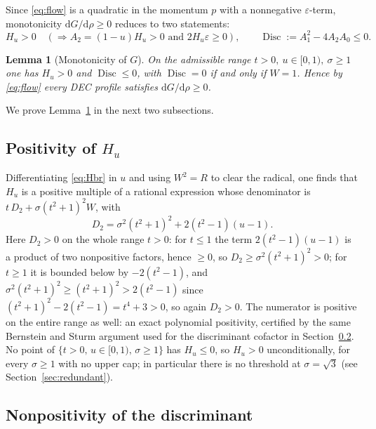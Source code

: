 \documentclass[11pt]{article}
\theoremstyle{plain}
\newtheorem{lemma}[theorem]{Lemma}
\theoremstyle{definition}
\newcommand{\dd}{\mathrm{d}}
\newcommand{\Disc}{\operatorname{Disc}}
\newcommand{\eps}{\varepsilon}
\begin{document}
Since \eqref{eq:flow} is a quadratic in the momentum $p$ with a nonnegative $\eps$-term, monotonicity
$\dd G/\dd\rho\ge0$ reduces to two statements:
\begin{equation*}
  H_u>0\quad(\Rightarrow A_2=(1-u)H_u>0\text{ and }2H_u\eps\ge0),\qquad \Disc:=A_1^2-4A_2A_0\le0 .
\end{equation*}

\begin{lemma}[Monotonicity of $G$]\label{lem:psd}
On the admissible range $t>0,\ u\in[0,1),\ \sigma\ge1$ one has $H_u>0$ and $\Disc\le0$, with $\Disc=0$
if and only if $W=1$. Hence by \eqref{eq:flow} every DEC profile satisfies $\dd G/\dd\rho\ge0$.
\end{lemma}

\noindent We prove Lemma~\ref{lem:psd} in the next two subsections.

\subsection{Positivity of \texorpdfstring{$H_u$}{Hu}}\label{sec:Hu}

Differentiating \eqref{eq:Hbr} in $u$ and using $W^2=R$ to clear the radical, one finds that $H_u$ is a
positive multiple of a rational expression whose denominator is $t\,D_2+\sigma(t^2+1)^2W$, with
\[
  D_2=\sigma^2(t^2+1)^2+2(t^2-1)(u-1).
\]
Here $D_2>0$ on the whole range $t>0$: for $t\le1$ the term $2(t^2-1)(u-1)$ is a product of two nonpositive
factors, hence $\ge0$, so $D_2\ge\sigma^2(t^2+1)^2>0$; for $t\ge1$ it is bounded below by $-2(t^2-1)$, and
$\sigma^2(t^2+1)^2\ge(t^2+1)^2>2(t^2-1)$ since $(t^2+1)^2-2(t^2-1)=t^4+3>0$, so again $D_2>0$. The
numerator is positive on the entire range as well: an exact polynomial positivity, certified by the same
Bernstein and Sturm argument used for the discriminant cofactor in Section~\ref{sec:disc}. No point of
$\{t>0,\,u\in[0,1),\,\sigma\ge1\}$ has $H_u\le0$, so $H_u>0$ unconditionally, for every $\sigma\ge1$
with no upper cap; in particular there is no threshold at $\sigma=\sqrt3$ (see Section~\ref{sec:redundant}).

\subsection{Nonpositivity of the discriminant}\label{sec:disc}
\end{document}
